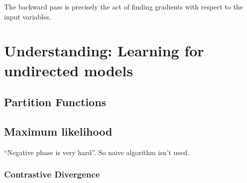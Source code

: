 \documentclass[11pt]{article}
\begin{document}
The backward pass is precisely the act of finding gradients with respect to the input variables.




\section{Understanding: Learning for undirected models}
\label{sec:org48920c9}
\subsection{Partition Functions}
\label{sec:org864bc16}
\subsection{Maximum likelihood}
\label{sec:orgc2c3d90}
``Negative phase is very hard''. So naive algorithm isn't used.

\subsubsection{Contrastive Divergence}
\label{sec:org76255e1}
\end{document}

